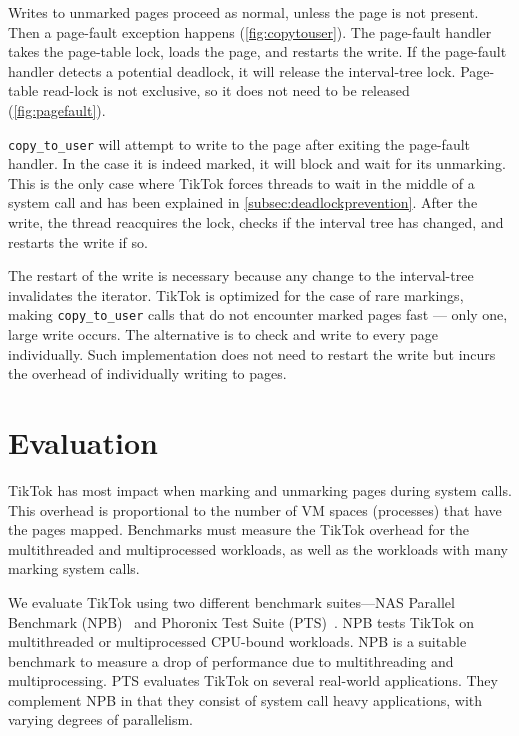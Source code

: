 \documentclass[conference]{IEEEtran}
\newcommand{\sysname}{TikTok}
\begin{document}
Writes to unmarked pages proceed as normal, unless the page is not present. Then
a page-fault exception happens (\autoref{fig:copytouser}). The page-fault
handler takes the page-table lock, loads the page, and restarts the write. If the
page-fault handler detects a potential deadlock, it will release the
interval-tree lock. Page-table read-lock is not exclusive, so it does not need
to be released (\autoref{fig:pagefault}).

\texttt{copy\_to\_user} will attempt to write to the page after exiting the
page-fault handler. In the case it is indeed marked, it will block and wait for
its unmarking. This is the only case where \sysname{} forces threads to wait in
the middle of a system call and has been explained in
\autoref{subsec:deadlockprevention}. After the write, the thread reacquires the
lock, checks if the interval tree has changed, and restarts the write if so.

The restart of the write is necessary because any change to the interval-tree
invalidates the iterator. \sysname{} is optimized for the case of rare markings,
making \texttt{copy\_to\_user} calls that do not encounter marked pages fast
--- only one, large write occurs. The alternative is to check and write to every
page individually. Such implementation does not need to restart the write but
incurs the overhead of individually writing to pages.

\section{Evaluation}
\label{sec:evaluation}


\sysname{} has most impact when marking and unmarking pages during
system calls. This overhead is proportional to the number of VM spaces
(processes) that have the pages mapped. Benchmarks must measure the \sysname{}
overhead for the multithreaded and multiprocessed workloads, as well as the
workloads with many marking system calls.

We evaluate \sysname{} using two different benchmark suites---NAS Parallel
Benchmark (NPB)~\cite{npb} and Phoronix Test Suite (PTS)~\cite{pts}. NPB tests
\sysname{} on multithreaded or multiprocessed CPU-bound workloads. NPB is a
suitable benchmark to measure a drop of performance due to multithreading and
multiprocessing. PTS evaluates \sysname{} on several real-world applications.
They complement NPB in that they consist of system call heavy applications, with
varying degrees of parallelism.
\end{document}
